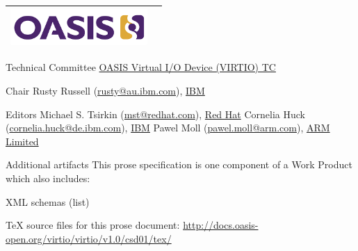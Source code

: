 \begin{titlepage}
\thispagestyle{fancy}

\begin{tabular*}{\textwidth}{@{\extracolsep{\fill}}lr}
	\includegraphics[height=0.55in]{images/oasis.png}\\
	\hline
\end{tabular*}

\vspace{0.05in}\vfill
\oasisstagelabel{\virtioworkingdraftdate}

\vfill

\begin{oasistitlesection}{Technical Committee}
\href{https://www.oasis-open.org/committees/virtio/}{OASIS Virtual I/O Device (VIRTIO) TC}
\end{oasistitlesection}

\begin{oasistitlesection}{Chair}
Rusty Russell (\href{mailto:rusty@au.ibm.com}{rusty@au.ibm.com}), \href{http://www.ibm.com/}{IBM}\newline
\end{oasistitlesection}

\begin{oasistitlesection}{Editors}
Michael S. Tsirkin (\href{mailto:mst@redhat.com}{mst@redhat.com}), \href{http://redhat.com/}{Red Hat}\newline
Cornelia Huck (\href{mailto:cornelia.huck@de.ibm.com}{cornelia.huck@de.ibm.com}), \href{http://www.ibm.com/}{IBM}\newline
Pawel Moll (\href{mailto:pawel.moll@arm.com}{pawel.moll@arm.com}), \href{https://arm.com/}{ARM Limited}
\end{oasistitlesection}


\begin{oasistitlesection}{Additional artifacts}
This prose specification is one component of a Work Product which also includes:
\begin{itemize*}
	\item XML schemas (list)\newline
	\item TeX source files for this prose document:\newline
	\url{http://docs.oasis-open.org/virtio/virtio/v1.0/csd01/tex/}
\end{itemize*}
\end{oasistitlesection}
\vspace{-0.2in}


\end{titlepage}
